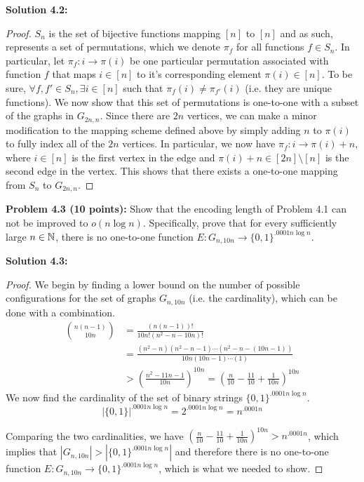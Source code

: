 \documentclass[11pt]{article}
\newcommand{\binom}[2]{{#1 \choose #2}}
\begin{document}
\textbf{Solution 4.2:} %
\begin{proof}
	$S_n$ is the set of bijective functions mapping $[n]$ to $[n]$ and as such, represents a set of permutations, which we denote $\pi_{f}$ for all functions $f \in S_n$.
	In particular, let $\pi_f: i \rightarrow \pi(i)$ be one particular permutation associated with function $f$ that maps $i \in [n]$ to it's corresponding element $\pi(i) \in [n]$.
	To be sure, $\forall f, f' \in S_n, \exists i \in [n]$ such that $\pi_{f}(i) \neq \pi_{f'}(i)$ (i.e. they are unique functions). We now show that this set of permutations is one-to-one with a subset of the graphs in $G_{2n,n}$.
	Since there are $2n$ vertices, we can make a minor modification to the mapping scheme defined above by simply adding $n$ to $\pi(i)$ to fully index all of the $2n$ vertices.
	In particular, we now have $\pi_f: i \rightarrow \pi(i) + n$, where $i \in [n]$ is the first vertex in the edge and $\pi(i) + n \in [2n] \setminus [n]$ is the second edge in the vertex.
	This shows that there exists a one-to-one mapping from $S_n$ to $G_{2n,n}$.
\end{proof}

\textbf{Problem 4.3 (10 points):}
Show that the encoding length of Problem 4.1 can not be improved to $o(n \log n)$. Specifically, prove that
for every sufficiently large $n\in\mathbb{N}$, there is no one-to-one function
$E:G_{n, 10n} \to \{0,1\}^{.0001 n \log n}$.

\textbf{Solution 4.3:} %
\begin{proof}
	We begin by finding a lower bound on the number of possible configurations for the set of graphs $G_{n, 10n}$ (i.e. the cardinality), which can be done with a combination.
	\begin{align*}
		\binom{n(n-1)}{10n} &=  \frac{(n(n-1))!}{10n!(n^2 - n - 10n)!} \\ 
		&= \frac{(n^2 - n)(n^2 - n - 1) \dotsb (n^2 - n - (10n - 1))}{10n(10n - 1) \dotsb (1)}	\\
		&> (\frac{n^2 - 11n - 1}{10n})^{10n} = (\frac{n}{10} - \frac{11}{10} + \frac{1}{10n})^{10n}
	\end{align*}
	We now find the cardinality of the set of binary strings $\{0,1\}^{.0001 n \log n}$.
	$$|\{0,1\}|^{.0001 n \log n} = 2^{.0001 n \log n} = n^{.0001 n}$$

	Comparing the two cardinalities, we have $(\frac{n}{10} - \frac{11}{10} + \frac{1}{10n})^{10n} > n^{.0001 n}$, which implies that $|G_{n, 10n}| > |\{0,1\}^{.0001 n \log n}|$ and therefore there is no one-to-one function $E:G_{n, 10n} \to \{0,1\}^{.0001 n \log n}$, which is what we needed to show.
\end{proof}
\end{document}
